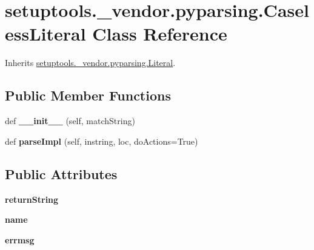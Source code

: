 \hypertarget{classsetuptools_1_1__vendor_1_1pyparsing_1_1_caseless_literal}{}\section{setuptools.\+\_\+vendor.\+pyparsing.\+Caseless\+Literal Class Reference}
\label{classsetuptools_1_1__vendor_1_1pyparsing_1_1_caseless_literal}


Inherits \hyperlink{classsetuptools_1_1__vendor_1_1pyparsing_1_1_literal}{setuptools.\+\_\+vendor.\+pyparsing.\+Literal}.

\subsection*{Public Member Functions}
\begin{DoxyCompactItemize}
\item 
\mbox{\label{classsetuptools_1_1__vendor_1_1pyparsing_1_1_caseless_literal_addabb133817e090020fa036c6d80b642}} 
def {\bfseries \+\_\+\+\_\+init\+\_\+\+\_\+} (self, match\+String)
\item 
\mbox{\label{classsetuptools_1_1__vendor_1_1pyparsing_1_1_caseless_literal_a5e1ea0886b7a8b59fd5e178fbea79cc6}} 
def {\bfseries parse\+Impl} (self, instring, loc, do\+Actions=True)
\end{DoxyCompactItemize}
\subsection*{Public Attributes}
\begin{DoxyCompactItemize}
\item 
\mbox{\label{classsetuptools_1_1__vendor_1_1pyparsing_1_1_caseless_literal_a51c2481d99a1d503a473c1c92a12ee9c}} 
{\bfseries return\+String}
\item 
\mbox{\label{classsetuptools_1_1__vendor_1_1pyparsing_1_1_caseless_literal_a3b03861ddca5913c14881cc79f5de7df}} 
{\bfseries name}
\item 
\mbox{\label{classsetuptools_1_1__vendor_1_1pyparsing_1_1_caseless_literal_ad9db3830c3b3635f6b6d93552f096756}} 
{\bfseries errmsg}
\end{DoxyCompactItemize}
